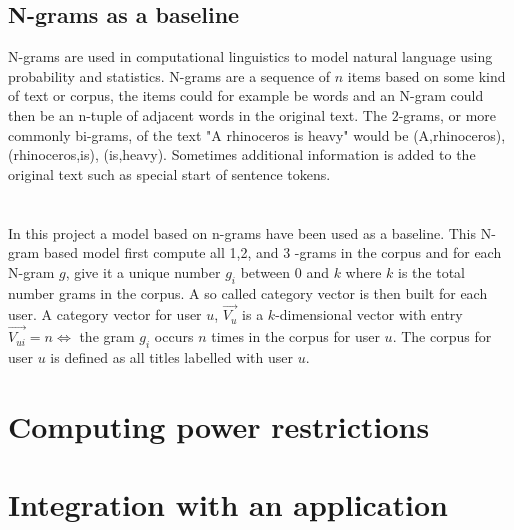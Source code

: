 \subsection{N-grams as a baseline}
N-grams are used in computational linguistics to model natural language using probability and statistics.  N-grams are a sequence of $n$ items based on some kind of text or corpus, the items could for example be words and an N-gram could then be an n-tuple of adjacent words in the original text. The $2$-grams, or more commonly bi-grams, of the text "A rhinoceros is heavy" would be (A,rhinoceros), (rhinoceros,is), (is,heavy). Sometimes additional information is added to the original text such as special start of sentence tokens.\\
\\\\
In this project a model based on n-grams have been used as a baseline. This N-gram based model first compute  all 1,2, and 3 -grams in the corpus and for each N-gram $g$, give it a unique number $g_i$ between $0$ and $k$ where $k$ is the total number grams in the corpus. A so called category vector is then built for each user. A category vector for user $u$, $\vec{V_u}$ is a $k$-dimensional vector with entry $\vec{V_{ui}} = n \iff $ the gram $g_i$ occurs $n$ times in the corpus for user $u$. The corpus for user $u$ is defined as all titles labelled with user $u$.

\section{Computing power restrictions} %
\section{Integration with an application}


